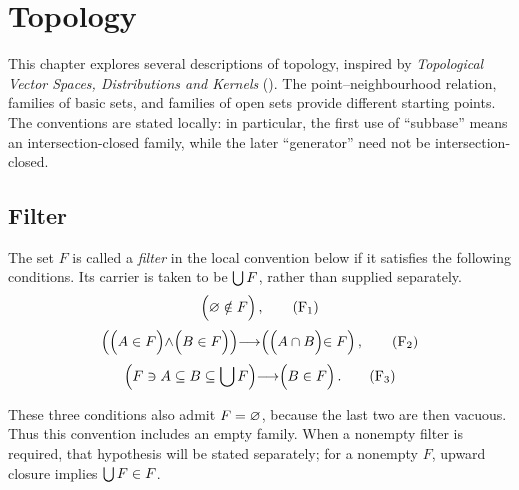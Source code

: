 \def\topic{}

\section{Topology}
This chapter explores several descriptions of topology, inspired by
\emph{Topological Vector Spaces, Distributions and Kernels}
(\cite{Treves1967}). The point--neighbourhood relation, families of basic
sets, and families of open sets provide different starting points.
The conventions are stated locally: in particular, the first use of
``subbase'' means an intersection-closed family, while the later
``generator'' need not be intersection-closed.
\subsection{Filter}
\begin{definition}[filter]
The set $F$ is called a \textit{filter} in the local convention below if
it satisfies the following conditions. Its carrier is taken to be
$\bigcup F$, rather than supplied separately.
\[
\left( \emptyclass\notin F \vphantom\union \right),
\tag{F$_1$}
\]
\[
\left(
\middle(
A\in F
\middle)
\land
\middle(
B\in F
\middle)
\middle)
\implies
\middle(\middle(A\cap B\middle)\in F \vphantom\union \right),
\tag{F$_2$}
\]
\[
\left(F \ni A \subseteq B \subseteq \bigcup F\middle)
\longrightarrow
\middle(B\in F\right).
\tag{F$_3$}
\]

\end{definition}
These three conditions also admit $F=\varnothing$, because the last two
are then vacuous. Thus this convention includes an empty family. When a
nonempty filter is required, that hypothesis will be stated separately;
for a nonempty $F$, upward closure implies $\bigcup F\in F$.
